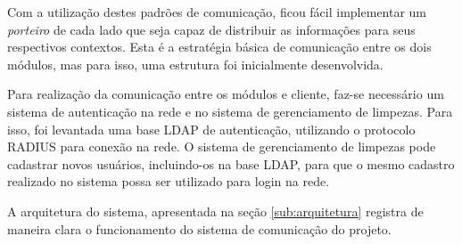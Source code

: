 		Com a utilização destes padrões de comunicação, ficou fácil implementar um \textit{porteiro} de cada lado que seja capaz de distribuir as informações para seus respectivos contextos. Esta é a estratégia básica de comunicação entre os dois módulos, mas para isso, uma estrutura foi inicialmente desenvolvida.

		Para realização da comunicação entre os módulos e cliente, faz-se necessário um sistema de autenticação na rede e no sistema de gerenciamento de limpezas. Para isso, foi levantada uma base LDAP de autenticação, utilizando o protocolo RADIUS para conexão na rede. O sistema de gerenciamento de limpezas pode cadastrar novos usuários, incluindo-os na base LDAP, para que o mesmo cadastro realizado no sistema possa ser utilizado para login na rede.

		A arquitetura do sistema, apresentada na seção \ref{sub:arquitetura} registra de maneira clara o funcionamento do sistema de comunicação do projeto. 

